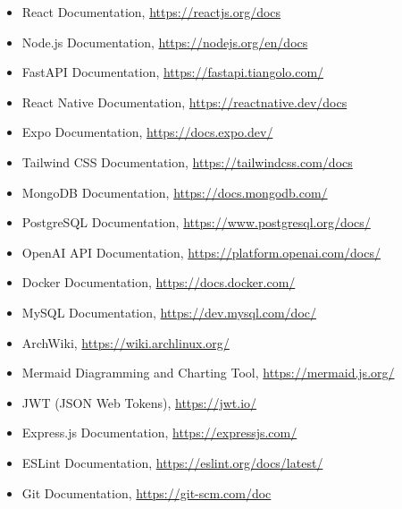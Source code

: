 \documentclass[12pt, a4paper]{report}
\begin{document}
\begin{itemize}
  \item React Documentation, \url{https://reactjs.org/docs}
  
  \item Node.js Documentation, \url{https://nodejs.org/en/docs}
  
  \item FastAPI Documentation, \url{https://fastapi.tiangolo.com/}
  
  \item React Native Documentation, \url{https://reactnative.dev/docs}
  
  \item Expo Documentation, \url{https://docs.expo.dev/}
  
  \item Tailwind CSS Documentation, \url{https://tailwindcss.com/docs}
  
  \item MongoDB Documentation, \url{https://docs.mongodb.com/}
  
  \item PostgreSQL Documentation, \url{https://www.postgresql.org/docs/}
  
  \item OpenAI API Documentation, \url{https://platform.openai.com/docs/}
  
  \item Docker Documentation, \url{https://docs.docker.com/}
  
  \item MySQL Documentation, \url{https://dev.mysql.com/doc/}
  
  \item ArchWiki, \url{https://wiki.archlinux.org/}
  
  \item Mermaid Diagramming and Charting Tool, \url{https://mermaid.js.org/}
  
  \item JWT (JSON Web Tokens), \url{https://jwt.io/}

  \item Express.js Documentation, \url{https://expressjs.com/}
  
  \item ESLint Documentation, \url{https://eslint.org/docs/latest/}
  
  \item Git Documentation, \url{https://git-scm.com/doc}
\end{itemize}
\end{document}
